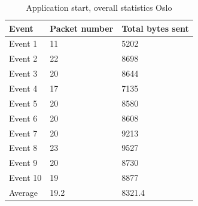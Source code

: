 \begin{table}[H]
\centering
\caption{Application start, overall statistics Oslo}
\label{tab:ASoverallOslo}
\begin{tabular}{|l|l|l|}
\hline
\textbf{Event} & \textbf{Packet number} & \textbf{Total bytes sent} \\ \hline
Event 1        & 11                     & 5202                      \\ \hline
Event 2        & 22                     & 8698                      \\ \hline
Event 3        & 20                     & 8644                      \\ \hline
Event 4        & 17                     & 7135                      \\ \hline
Event 5        & 20                     & 8580                      \\ \hline
Event 6        & 20                     & 8608                      \\ \hline
Event 7        & 20                     & 9213                      \\ \hline
Event 8        & 23                     & 9527                      \\ \hline
Event 9        & 20                     & 8730                      \\ \hline
Event 10       & 19                     & 8877                      \\ \hline
Average        & 19.2                   & 8321.4                    \\ \hline
\end{tabular}
\end{table}

